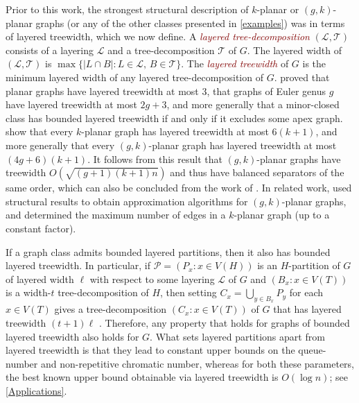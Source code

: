 \documentclass{patmorin}
\theoremstyle{plain}
\theoremstyle{definition}
\newcommand{\defin}[1]{\textcolor{Maroon}{\emph{#1}}}
\newcommand{\PP}{\mathcal{P}}
\begin{document}
Prior to this work, the strongest structural description of $k$-planar or $(g,k)$-planar graphs (or any of the other classes presented in \cref{examples}) was in terms of layered treewidth, which we now define.  A \defin{layered tree-decomposition} $(\mathcal{L},\mathcal{T})$ consists of a layering $\mathcal{L}$ and a tree-decomposition $\mathcal{T}$ of $G$. The layered width of $(\mathcal{L},\mathcal{T})$ is $\max\{|L\cap B|: L\in \mathcal{L},\, B\in \mathcal{T}\}$.  The \defin{layered treewidth} of $G$ is the minimum layered width of any layered tree-decomposition of $G$. \citet{dujmovic.morin.ea:layered} proved that planar graphs have layered treewidth at most 3, that graphs of Euler genus $g$ have layered treewidth at most $2g+3$, and more generally that a minor-closed class has bounded layered treewidth if and only if it excludes some apex graph. \citet{dujmovic.eppstein.ea:structure} show that every $k$-planar graph has layered treewidth at most $6(k+1)$, and more generally that every $(g,k)$-planar graph has layered treewidth at most $(4g+6)(k+1)$. It follows from this result that $(g,k)$-planar graphs have treewidth $O(\sqrt{(g+1)(k+1)n})$ and thus have balanced separators of the same order, which can also be concluded from the work of \citet{FP08}. In related work, \citet{grigoriev.bodlaender:algorithms} used structural results to obtain approximation algorithms for $(g,k)$-planar graphs, and \citet{PachToth97} determined the maximum number of edges in a $k$-planar graph (up to a constant factor).

If a graph class admits bounded layered partitions, then it also has bounded layered treewidth. In particular, if $\PP=(P_x:x\in V(H))$ is an $H$-partition of $G$ of layered width $\ell$ with respect to some layering $\mathcal{L}$ of $G$ and $(B_x:x\in V(T))$ is a width-$t$ tree-decomposition of $H$, then setting $C_x = \bigcup_{y\in B_x} P_y$ for each $x\in V(T)$ gives a tree-decomposition $(C_x:x\in V(T))$ of $G$ that has layered treewidth $(t+1)\ell$ \cite{DJMMUW20}. Therefore, any property that holds for graphs of bounded layered treewidth also holds for $G$. What sets layered partitions apart from layered treewidth is that they lead to constant upper bounds on the queue-number  and non-repetitive chromatic number, whereas for both these parameters, the best known upper bound obtainable via layered treewidth is $O(\log n)$; see \cref{Applications}.



\label{sec-k-planar}
\end{document}

